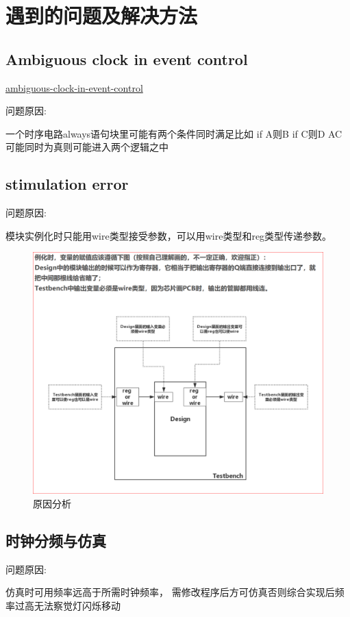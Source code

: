 \documentclass[UTF8]{article}
\begin{document}
\section{遇到的问题及解决方法}
\subsection{Ambiguous clock in event control}

\href{https://stackoverflow.com/questions/27145548/ambiguous-clock-in-event-control}{ambiguous-clock-in-event-control} 

问题原因: 

一个时序电路always语句块里可能有两个条件同时满足比如
    if A则B
    if C则D
AC可能同时为真则可能进入两个逻辑之中

\subsection{stimulation error}
问题原因:

模块实例化时只能用wire类型接受参数，可以用wire类型和reg类型传递参数。

\begin{figure}[H]
    \centering
    \includegraphics[scale=0.4]{0.PNG}
    \caption{原因分析}
    \label{FIG.12}
\end{figure}

\subsection{时钟分频与仿真}
问题原因: 

仿真时可用频率远高于所需时钟频率，
需修改程序后方可仿真否则综合实现后频率过高无法察觉灯闪烁移动
\end{document}
